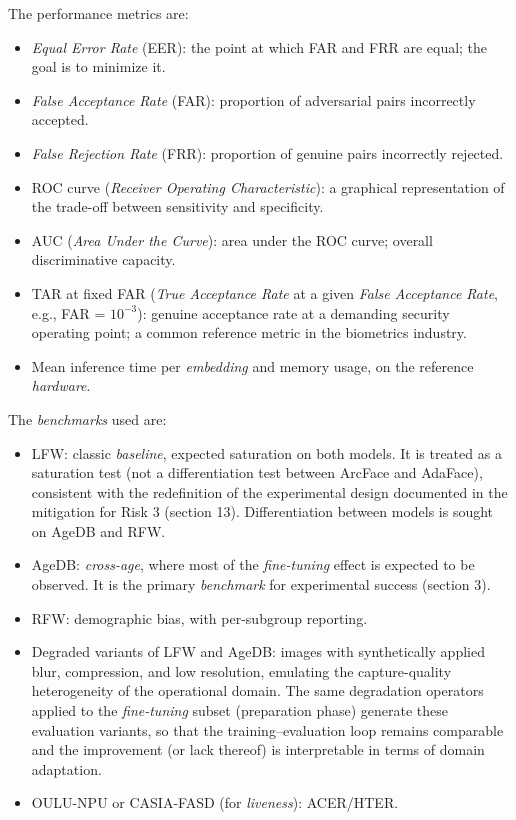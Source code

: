\documentclass[
  11pt, %
]{charter}
\begin{document}
The performance metrics are:

\begin{itemize}
  \item \textit{Equal Error Rate} (EER): the point at which FAR and FRR are equal; the goal is to minimize it.
  \item \textit{False Acceptance Rate} (FAR): proportion of adversarial pairs incorrectly accepted.
  \item \textit{False Rejection Rate} (FRR): proportion of genuine pairs incorrectly rejected.
  \item ROC curve (\textit{Receiver Operating Characteristic}): a graphical representation of the trade-off between sensitivity and specificity.
  \item AUC (\textit{Area Under the Curve}): area under the ROC curve; overall discriminative capacity.
  \item TAR at fixed FAR (\textit{True Acceptance Rate} at a given \textit{False Acceptance Rate}, e.g., FAR = $10^{-3}$): genuine acceptance rate at a demanding security operating point; a common reference metric in the biometrics industry.
  \item Mean inference time per \textit{embedding} and memory usage, on the reference \textit{hardware}.
\end{itemize}

The \textit{benchmarks} used are:

\begin{itemize}
  \item LFW: classic \textit{baseline}, expected saturation on both models. It is treated as a saturation test (not a differentiation test between ArcFace and AdaFace), consistent with the redefinition of the experimental design documented in the mitigation for Risk 3 (section 13). Differentiation between models is sought on AgeDB and RFW.
  \item AgeDB: \textit{cross-age}, where most of the \textit{fine-tuning} effect is expected to be observed. It is the primary \textit{benchmark} for experimental success (section 3).
  \item RFW: demographic bias, with per-subgroup reporting.
  \item Degraded variants of LFW and AgeDB: images with synthetically applied blur, compression, and low resolution, emulating the capture-quality heterogeneity of the operational domain. The same degradation operators applied to the \textit{fine-tuning} subset (preparation phase) generate these evaluation variants, so that the training--evaluation loop remains comparable and the improvement (or lack thereof) is interpretable in terms of domain adaptation.
  \item OULU-NPU or CASIA-FASD (for \textit{liveness}): ACER/HTER.
\end{itemize}
\end{document}
